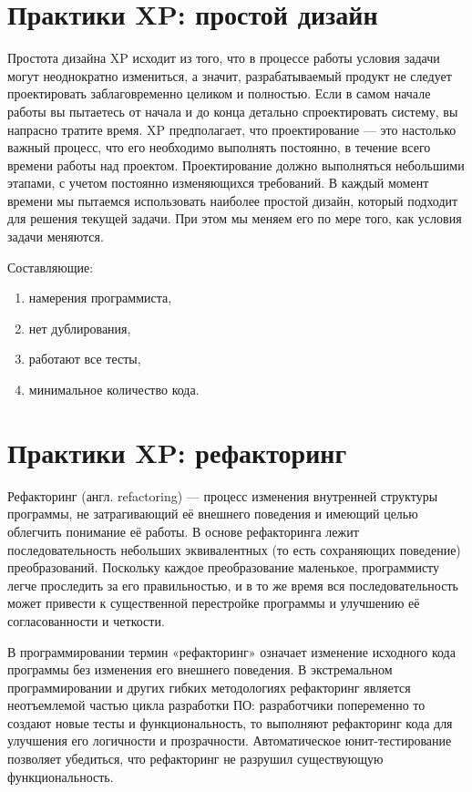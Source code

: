 \documentclass{article}
\let\stdsection\section
\renewcommand\section{\newpage\stdsection}
\begin{document}
\section{Практики XP: простой дизайн}
    Простота дизайна XP исходит из того, что в процессе работы условия задачи могут неоднократно измениться, а значит, разрабатываемый продукт не следует проектировать заблаговременно целиком и полностью. Если в самом начале работы вы пытаетесь от начала и до конца детально спроектировать систему, вы напрасно тратите время. XP предполагает, что проектирование — это настолько важный процесс, что его необходимо выполнять постоянно, в течение всего времени работы над проектом. Проектирование должно выполняться небольшими этапами, с учетом постоянно изменяющихся требований. В каждый момент времени мы пытаемся использовать наиболее простой дизайн, который подходит для решения текущей задачи. При этом мы меняем его по мере того, как условия задачи меняются.

    Составляющие:
    \begin{enumerate}
        \item намерения программиста,%
        \item нет дублирования,
        \item работают все тесты,
        \item минимальное количество кода.
    \end{enumerate}

\section{Практики XP: рефакторинг}
    Рефакторинг (англ. refactoring) — процесс изменения внутренней структуры программы, не затрагивающий её внешнего поведения и имеющий целью облегчить понимание её работы. В основе рефакторинга лежит последовательность небольших эквивалентных (то есть сохраняющих поведение) преобразований. Поскольку каждое преобразование маленькое, программисту легче проследить за его правильностью, и в то же время вся последовательность может привести к существенной перестройке программы и улучшению её согласованности и четкости.

    В программировании термин «рефакторинг» означает изменение исходного кода программы без изменения его внешнего поведения. В экстремальном программировании и других гибких методологиях рефакторинг является неотъемлемой частью цикла разработки ПО: разработчики попеременно то создают новые тесты и функциональность, то выполняют рефакторинг кода для улучшения его логичности и прозрачности. Автоматическое юнит-тестирование позволяет убедиться, что рефакторинг не разрушил существующую функциональность.
\end{document}
